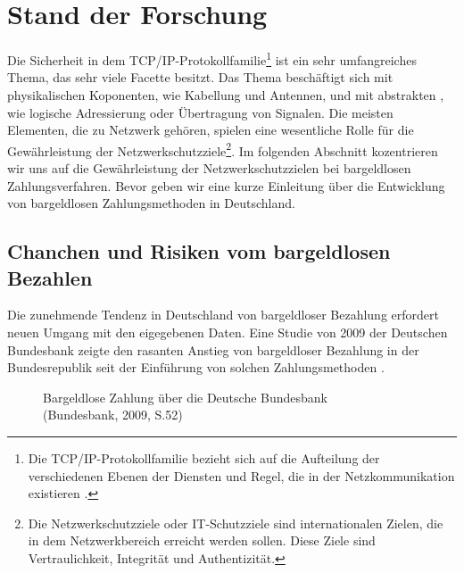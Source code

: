 \section{Stand der Forschung}

Die Sicherheit in dem TCP/IP-Protokollfamilie\footnote{Die TCP/IP-Protokollfamilie bezieht sich auf die Aufteilung 
der verschiedenen Ebenen der Diensten und Regel, die in der Netzkommunikation existieren \cite{refbook:SWIS}.} ist 
ein sehr umfangreiches Thema, das sehr viele Facette besitzt. Das Thema beschäftigt sich mit physikalischen 
Koponenten, wie Kabellung und Antennen, und mit abstrakten , wie logische Adressierung oder Übertragung von Signalen.
Die meisten Elementen, die zu Netzwerk gehören, spielen eine wesentliche Rolle für die Gewährleistung
der Netzwerkschutzziele\footnote{Die Netzwerkschutzziele oder IT-Schutzziele sind internationalen Zielen, 
die in dem Netzwerkbereich erreicht werden sollen. Diese Ziele sind Vertraulichkeit, Integrität und 
Authentizität.}. Im folgenden Abschnitt kozentrieren wir uns auf die Gewährleistung der Netzwerkschutzzielen
bei bargeldlosen Zahlungsverfahren. Bevor geben wir eine kurze Einleitung über die Entwicklung von bargeldlosen
Zahlungsmethoden in Deutschland.


\subsection{Chanchen und Risiken vom bargeldlosen Bezahlen}

Die zunehmende Tendenz in Deutschland von bargeldloser Bezahlung erfordert neuen Umgang mit den 
eigegebenen Daten. Eine Studie von 2009 der Deutschen Bundesbank zeigte den rasanten Anstieg von 
bargeldloser Bezahlung in der Bundesrepublik seit der Einführung von solchen Zahlungsmethoden 
\cite{refrep:DBCP}.

\begin{figure}[H]
    \caption{Bargeldlose Zahlung über die Deutsche Bundesbank\\ (Bundesbank, 2009, S.52)}
    \label{fig:refrep_DB}
\end{figure}



